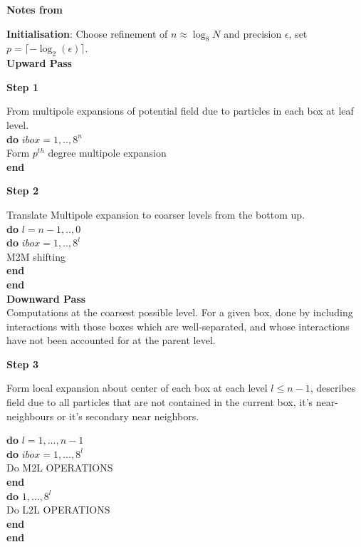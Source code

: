 \label{app:analytic_fmm}
\textbf{Notes from \cite{Greengard:1987:Yale}}

\textbf{Initialisation}: Choose refinement of $n \approx \log_8 N$ and precision
$\epsilon$, set $p= \lceil -\log_2(\epsilon) \rceil$. \\

\textbf{Upward Pass}
\begin{center}
    \textbf{Step 1}
\end{center}
From multipole expansions of potential field due to particles in each box at
leaf level. \\

\noindent \textbf{do} $\textit{ibox}=1,..,8^n$ \\
\indent   Form $p^{th}$ degree multipole expansion \\
\noindent \textbf{end}

\begin{center}
    \textbf{Step 2}
\end{center}
Translate Multipole expansion to coarser levels from the bottom up.\\

\noindent \textbf{do} $l=n-1,..,0$ \\
\indent \textbf{do} $\textit{ibox}=1,..,8^l$ \\
\indent \indent M2M shifting \\
\indent \textbf{end} \\
\noindent \textbf{end} \\

\textbf{Downward Pass} \\

Computations at the coarsest possible level. For a given box, done by including
interactions with those boxes which are \gls{well-separated}, and whose interactions
have not been accounted for at the parent level.

\begin{center}
    \textbf{Step 3}
\end{center}
Form local expansion about center of each box at each level $l \leq n-1$, describes
field due to all particles that are not contained in the current box, it's \gls{near-neighbours}
or it's secondary near neighbors.

\noindent \textbf{do} $l=1,...,n-1$ \\
\indent \textbf{do} $\textit{ibox}=1,...,8^l$ \\
\indent \indent Do M2L OPERATIONS \\
\indent \textbf{end} \\
\indent \textbf{do} $1,...,8^l$ \\
\indent \indent Do L2L OPERATIONS \\
\indent \textbf{end} \\
\noindent \textbf{end}\\

